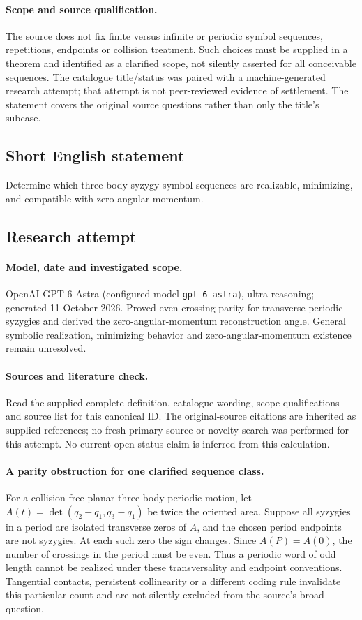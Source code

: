 \documentclass[11pt]{article}
\begin{document}
\paragraph{Scope and source qualification.}The source does not fix finite versus infinite or periodic symbol sequences, repetitions, endpoints or collision treatment. Such choices must be supplied in a theorem and identified as a clarified scope, not silently asserted for all conceivable sequences. The catalogue title/status was paired with a machine-generated research attempt; that attempt is not peer-reviewed evidence of settlement. The statement covers the original source questions rather than only the title’s subcase.
\subsection{Short English statement}
Determine which three-body syzygy symbol sequences are realizable, minimizing, and compatible with zero angular momentum.
\subsection{Research attempt}
\paragraph{Model, date and investigated scope.}
OpenAI GPT-6 Astra (configured model \texttt{gpt-6-astra}), ultra reasoning; generated 11 October 2026. Proved even crossing parity for transverse periodic syzygies and derived the zero-angular-momentum reconstruction angle. General symbolic realization, minimizing behavior and zero-angular-momentum existence remain unresolved.

\paragraph{Sources and literature check.}
Read the supplied complete definition, catalogue wording, scope qualifications and source list for this canonical ID. The original-source citations are inherited as supplied references; no fresh primary-source or novelty search was performed for this attempt. No current open-status claim is inferred from this calculation.

\paragraph{A parity obstruction for one clarified sequence class.}For a collision-free planar three-body periodic motion, let \(A(t)=\det(q_2-q_1,q_3-q_1)\) be twice the oriented area. Suppose all syzygies in a period are isolated transverse zeros of \(A\), and the chosen period endpoints are not syzygies. At each such zero the sign changes. Since \(A(P)=A(0)\), the number of crossings in the period must be even. Thus a periodic word of odd length cannot be realized under these transversality and endpoint conventions. Tangential contacts, persistent collinearity or a different coding rule invalidate this particular count and are not silently excluded from the source's broad question.
\end{document}
